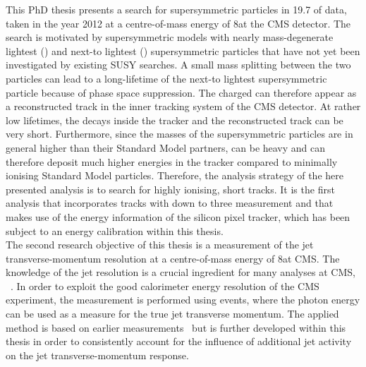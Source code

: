 This PhD thesis presents a search for supersymmetric particles in 19.7 \fbinv of data, taken in the year 2012 at a centre-of-mass energy of 8\tev at the CMS detector. 
The search is motivated by supersymmetric models with nearly mass-degenerate lightest (\chiO) and next-to lightest (\chipm) supersymmetric particles that have not yet been investigated by existing SUSY searches.       
A small mass splitting between the two particles can lead to a long-lifetime of the next-to lightest supersymmetric particle \chipm because of phase space suppression.
The charged \chipm can therefore appear as a reconstructed track in the inner tracking system of the CMS detector.
At rather low \chipm lifetimes, the \chipm decays inside the tracker and the reconstructed track can be very short.  
Furthermore, since the masses of the supersymmetric particles are in general higher than their Standard Model partners, \chipm can be heavy and can therefore deposit much higher energies in the tracker compared to minimally ionising Standard Model particles.
Therefore, the analysis strategy of the here presented analysis is to search for highly ionising, short tracks.
It is the first analysis that incorporates tracks with down to three measurement and that makes use of the energy information of the silicon pixel tracker, which has been subject to an energy calibration within this thesis.\\

The second research objective of this thesis is a measurement of the jet transverse-momentum resolution at a centre-of-mass energy of 8\tev at CMS.
The knowledge of the jet \pt resolution is a crucial ingredient for many analyses at CMS, \eg~\cite{bib:CMS:QCD_measurements,bib:CMS:TopCrossSection_8TeV,bib:CMS:RA2_8TeV}.
In order to exploit the good calorimeter energy resolution of the CMS experiment, the measurement is performed using \GAMJET events, where the photon energy can be used as a measure for the true jet transverse momentum.
The applied method is based on earlier measurements~\cite{bib:CMS:JERCPaper_2011,CMS:PAS:JETResolution_7TeV} but is further developed within this thesis in order to consistently account for the influence of additional jet activity on the jet transverse-momentum response.\\

